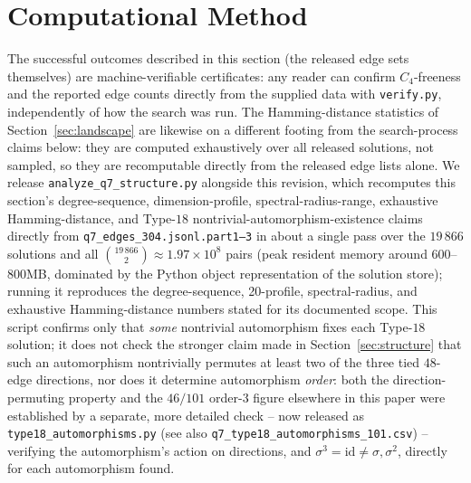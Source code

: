 \documentclass[12pt]{article}
\begin{document}
\section{Computational Method}\label{sec:method}

The successful outcomes described in this section (the released edge
sets themselves) are machine-verifiable certificates: any reader can
confirm $C_4$-freeness and the reported edge counts directly from the
supplied data with \texttt{verify.py}, independently of how the search
was run. The Hamming-distance statistics of Section~\ref{sec:landscape}
are likewise on a different footing from the search-process claims below:
they are computed exhaustively over all
released solutions, not sampled, so they are recomputable directly
from the released edge lists alone. We release
\texttt{analyze\_q7\_structure.py} alongside this revision, which
recomputes this section's degree-sequence, dimension-profile,
spectral-radius-range, exhaustive Hamming-distance, and Type-$18$
nontrivial-automorphism-existence claims directly from
\texttt{q7\_edges\_304.jsonl.part1--3} in about a single pass over the $19\,866$ solutions and all
$\binom{19\,866}{2}\approx1.97\times10^{8}$ pairs (peak resident memory
around $600$--$800$MB, dominated by the Python object representation of
the solution store); running it reproduces the degree-sequence, 20-profile, spectral-radius,
and exhaustive Hamming-distance numbers stated for its documented scope. This
script confirms
only that \emph{some} nontrivial automorphism fixes each Type-$18$
solution; it does not check the stronger claim made in
Section~\ref{sec:structure} that such an automorphism nontrivially
permutes at least two of the three tied $48$-edge directions, nor does
it determine automorphism \emph{order}: both the direction-permuting
property and the $46/101$ order-$3$ figure elsewhere in this paper
were established by a separate, more detailed check -- now released
as \texttt{type18\_automorphisms.py} (see also \texttt{q7\_type18\_automorphisms\_101.csv}) -- verifying the
automorphism's action on directions, and
$\sigma^3=\mathrm{id}\ne\sigma,\sigma^2$, directly for
each automorphism found.
\end{document}
